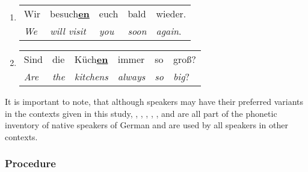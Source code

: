 \begin{enumerate}[label=\arabic{enumi}\alph*), ref=\arabic{enumi}\alph*.)]
	\item 
	\begin{tabulary}{\linewidth}{LLLLL}
		Wir 		& besuch\textbf{\underline{en}} & euch 		   & bald 		   & wieder.\\
		\textit{We} & \textit{will visit} 			& \textit{you} & \textit{soon} & \textit{again}.\\
	\end{tabulary}
	\item
	\begin{tabulary}{\linewidth}{LLLLLL}
		Sind 		 & die 			& Küch\textbf{\underline{en}} & immer		    & so 		  & groß?\\
		\textit{Are} & \textit{the} & \textit{kitchens} 		  & \textit{always} & \textit{so} & \textit{big}?\\
	\end{tabulary}
\end{enumerate}

It is important to note, that although speakers may have their preferred variants in the contexts given in this study, \textipa{[E:]}, \textipa{[e:]}, \textipa{[\c{c}]}, \textipa{[Ik]}, \textipa{[\s n]}, and \textipa{[@n]} are all part of the phonetic inventory of native speakers of German and are used by all speakers in other contexts.

\subsubsection{Procedure}
\label{subsubsec:procedure_hci}

